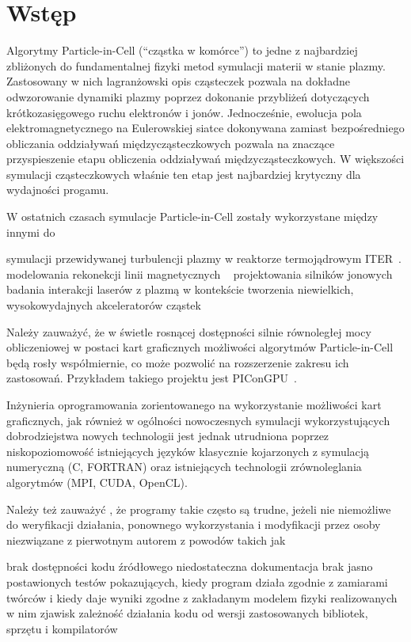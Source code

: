 \section[Wstęp]{Wstęp}\label{sec:intro} %
Algorytmy Particle-in-Cell (``cząstka w komórce'') to jedne z najbardziej
zbliżonych do fundamentalnej fizyki metod symulacji materii w stanie plazmy.
Zastosowany w nich lagranżowski opis cząsteczek pozwala na dokładne
odwzorowanie dynamiki plazmy poprzez dokonanie przybliżeń dotyczących
krótkozasięgowego ruchu elektronów i jonów. Jednocześnie, ewolucja pola
elektromagnetycznego na Eulerowskiej siatce dokonywana zamiast bezpośredniego
obliczania oddziaływań międzycząsteczkowych pozwala na znaczące przyspieszenie
etapu obliczenia oddziaływań międzycząsteczkowych. W większości symulacji
cząsteczkowych właśnie ten etap jest najbardziej krytyczny dla wydajności
progamu.\cite{birdsall}

W ostatnich czasach symulacje Particle-in-Cell zostały wykorzystane między innymi do
\begin{itemize}
\itemi{} symulacji przewidywanej turbulencji plazmy w reaktorze termojądrowym ITER~\cite{pic-turbulence}.
\itemi{} modelowania rekonekcji linii magnetycznych ~\cite{pic-reconnection}
\itemi{} projektowania silników jonowych~\cite{pic-hallengine}
\itemi{} badania interakcji laserów z plazmą w kontekście tworzenia niewielkich,
    wysokowydajnych akceleratorów cząstek~\cite{pic-laserplasma}
\end{itemize}

Należy zauważyć, że w świetle rosnącej dostępności silnie równoległej mocy
obliczeniowej w postaci kart graficznych możliwości algorytmów Particle-in-Cell
będą rosły współmiernie, co może pozwolić na rozszerzenie zakresu ich
zastosowań. Przykładem takiego projektu jest PIConGPU~\cite{picongpu}.

Inżynieria oprogramowania zorientowanego na wykorzystanie możliwości kart
graficznych, jak również w ogólności nowoczesnych symulacji wykorzystujących
dobrodziejstwa nowych technologii jest jednak utrudniona poprzez
niskopoziomowość istniejących języków klasycznie kojarzonych z symulacją
numeryczną (C, FORTRAN) oraz istniejących technologii zrównoleglania algorytmów
(MPI, CUDA, OpenCL).

Należy też zauważyć%
, że programy takie często są
trudne, jeżeli nie niemożliwe do weryfikacji działania, ponownego wykorzystania
i modyfikacji przez osoby niezwiązane z pierwotnym autorem z powodów takich jak
\begin{itemize}
    \itemi{} brak dostępności kodu źródłowego
    \itemi{} niedostateczna dokumentacja
    \itemi{} brak jasno postawionych testów pokazujących, kiedy program działa
    zgodnie z zamiarami twórców i kiedy daje wyniki zgodne z zakładanym
    modelem fizyki realizowanych w nim zjawisk
    \itemi{} zależność działania kodu od wersji zastosowanych bibliotek, sprzętu i kompilatorów
\end{itemize}

